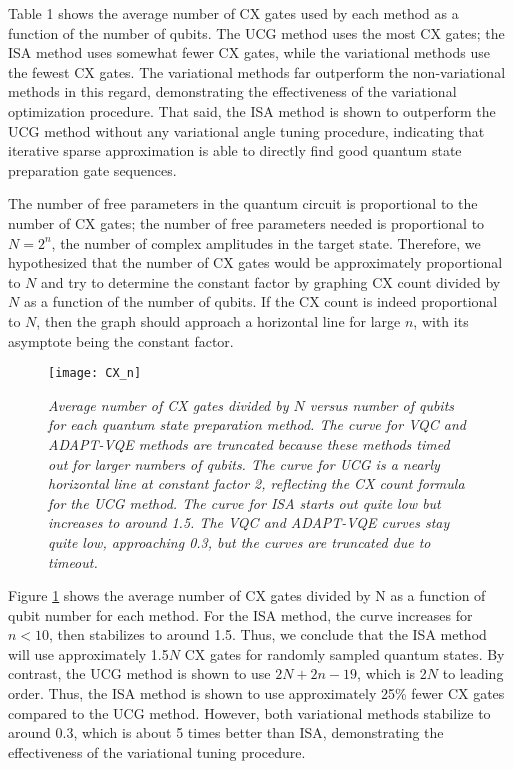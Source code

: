 \documentclass{article}
\begin{document}
Table 1 shows the average number of CX gates used by each method as a function
of the number of qubits. The UCG method uses the most CX gates; the ISA method
uses somewhat fewer CX gates, while the variational methods use the fewest
CX gates. The variational methods far outperform the non-variational methods
in this regard, demonstrating the effectiveness of the variational optimization
procedure. That said, the ISA method is shown to outperform the UCG method
without any variational angle tuning procedure, indicating that iterative sparse
approximation is able to directly find good quantum state preparation gate
sequences.

The number of free parameters in the quantum circuit is proportional to the
number of CX gates; the number of free parameters needed is proportional to
$N = 2^n$, the number of complex amplitudes in the target state. Therefore, we
hypothesized that the number of CX gates would be approximately proportional
to $N$ and try to determine the constant factor by graphing CX count divided by
$N$ as a function of the number of qubits. If the CX count is indeed
proportional to $N$, then the graph should approach a horizontal line for large
$n$, with its asymptote being the constant factor.

\begin{figure}[H]
\texttt{[image: CX\_n]}
\caption{\textit{Average number of CX gates divided by $N$ versus number of qubits for
each quantum state preparation method. The curve for VQC and ADAPT-VQE methods
are truncated because these methods timed out for larger numbers of qubits. The
curve for UCG is a nearly horizontal line at constant factor 2, reflecting the
CX count formula for the UCG method. The curve for ISA starts out quite low but
increases to around 1.5. The VQC and ADAPT-VQE curves stay quite low,
approaching 0.3, but the curves are truncated due to timeout.}}
\label{fig:CX_n}
\end{figure}

Figure \ref{fig:CX_n} shows the average number of CX gates divided by N as a function of
qubit number for each method. For the ISA method, the curve increases for 
$n < 10$, then stabilizes to around 1.5. Thus, we conclude that the ISA method
will use approximately 1.5$N$ CX gates for randomly sampled quantum states.
By contrast, the UCG method is shown to use $2N + 2n - 19$, which is 2$N$ to
leading order. Thus, the ISA method is shown to use approximately 25\% fewer
CX gates compared to the UCG method. However, both variational methods
stabilize to around 0.3, which is about 5 times better than ISA, demonstrating
the effectiveness of the variational tuning procedure.
\end{document}
